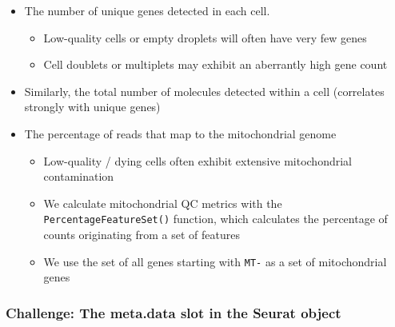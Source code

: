 \documentclass[
]{book}
\newenvironment{Shaded}{\begin{snugshade}}{\end{snugshade}}
\newcommand{\AttributeTok}[1]{\textcolor[rgb]{0.13,0.29,0.53}{#1}}
\newcommand{\CommentTok}[1]{\textcolor[rgb]{0.56,0.35,0.01}{\textit{#1}}}
\newcommand{\FunctionTok}[1]{\textcolor[rgb]{0.13,0.29,0.53}{\textbf{#1}}}
\newcommand{\NormalTok}[1]{#1}
\newcommand{\OtherTok}[1]{\textcolor[rgb]{0.56,0.35,0.01}{#1}}
\newcommand{\SpecialCharTok}[1]{\textcolor[rgb]{0.81,0.36,0.00}{\textbf{#1}}}
\newcommand{\StringTok}[1]{\textcolor[rgb]{0.31,0.60,0.02}{#1}}
\providecommand{\tightlist}{%
  \setlength{\itemsep}{0pt}\setlength{\parskip}{0pt}}
\begin{document}
\begin{itemize}
\tightlist
\item
  The number of unique genes detected in each cell.

  \begin{itemize}
  \tightlist
  \item
    Low-quality cells or empty droplets will often have very few genes
  \item
    Cell doublets or multiplets may exhibit an aberrantly high gene count
  \end{itemize}
\item
  Similarly, the total number of molecules detected within a cell (correlates strongly with unique genes)
\item
  The percentage of reads that map to the mitochondrial genome

  \begin{itemize}
  \tightlist
  \item
    Low-quality / dying cells often exhibit extensive mitochondrial contamination
  \item
    We calculate mitochondrial QC metrics with the \texttt{PercentageFeatureSet()} function, which calculates the percentage of counts originating from a set of features
  \item
    We use the set of all genes starting with \texttt{MT-} as a set of mitochondrial genes
  \end{itemize}
\end{itemize}

\begin{Shaded}
\end{Shaded}

\subsubsection*{Challenge: The meta.data slot in the Seurat object}\label{challenge-the-meta.data-slot-in-the-seurat-object}
\end{document}
